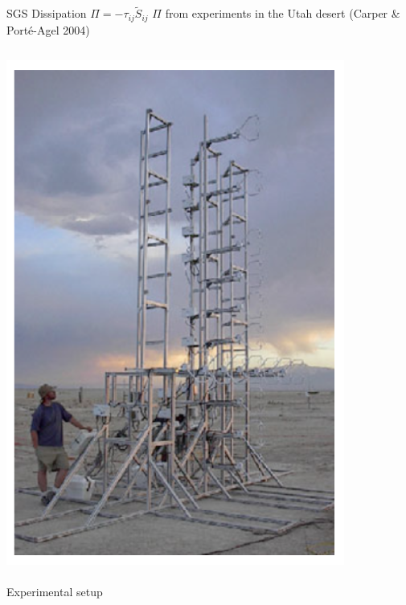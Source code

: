 \begin{frame}{SGS Dissipation $\Pi = -\tau_{ij}\widetilde{S}_{ij}$}
$\Pi$ from experiments in the Utah desert (Carper \& Port\'{e}-Agel 2004)
    \begin{columns}
    \begin{column}{.4\textwidth}
    \begin{minipage}[c][.6\textheight][c]{\linewidth}
    \includegraphics[width=\textwidth]{apriori5}
    ~\\\tiny{Experimental setup}
      \end{minipage}
    \end{column}
    \begin{column}{.6\textwidth}
      \begin{figure}

\end{figure}
\end{column}
\end{columns}
\end{frame}
